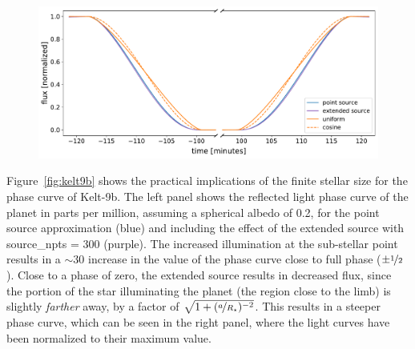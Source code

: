 \documentclass[modern]{aastex62}
\begin{document}
\begin{figure}[p!]
    \begin{centering}
        \includegraphics[width=\linewidth]{figures/kelt9b_eclipse.pdf}
    \end{centering}
\end{figure}

Figure~\ref{fig:kelt9b} shows the practical implications of the finite
stellar size for the phase curve of Kelt-9b. The left panel shows the
reflected light phase curve of the planet in parts per million, assuming
a spherical albedo of 0.2, for the point source approximation
(blue) and including the effect of the extended source with
\textsf{source\_npts} = 300 (purple). The increased
illumination at the sub-stellar point results in a ${\sim}30$ increase
in the value of the phase curve close to full phase ($\pm\nicefrac{1}{2}$).
Close to a phase of zero, the extended source results in decreased
flux, since the portion of the star illuminating the planet (the region
close to the limb) is slightly
\emph{farther} away, by a factor of
$\sqrt{1 + (\nicefrac{a}{R_\star})^{-2}}$. This results in a steeper
phase curve, which can be seen in the right panel, where the light curves
have been normalized to their maximum value.
\end{document}
